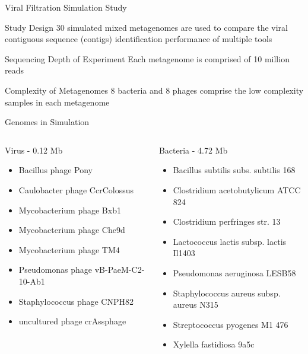 \documentclass[11pt]{beamer}
\begin{document}
	\begin{frame}{Viral Filtration Simulation Study}
	\begin{block}{Study Design}
	30 simulated mixed metagenomes are used to compare the viral contiguous sequence (contigs) identification performance of multiple tools
	\end{block}

	\begin{block}{Sequencing Depth of Experiment} 
	Each metagenome is comprised of 10 million reads
	\end{block}
	\begin{block}{Complexity of Metagenomes}
	8 bacteria and 8 phages comprise the low complexity samples in each metagenome
	\end{block}

	\end{frame}
	
	\begin{frame}{Genomes in Simulation}
	\begin{columns}
			\begin{block}{Virus - 0.12 Mb}
			\begin{itemize}
			\item Bacillus phage Pony
			\item Caulobacter phage CcrColossus
			\item Mycobacterium phage Bxb1
			\item Mycobacterium phage Che9d
			\item Mycobacterium phage TM4
			\item Pseudomonas phage vB-PaeM-C2-10-Ab1
			\item Staphylococcus phage CNPH82
			\item uncultured phage crAssphage
			\end{itemize}
			\end{block}	
			\begin{block}{Bacteria - 4.72 Mb}
			\begin{itemize}
			\item Bacillus subtilis subs. subtilis 168
			\item Clostridium acetobutylicum ATCC 824
			\item Clostridium perfringes str. 13
			\item Lactococcus lactis subsp. lactis Il1403
			\item Pseudomonas aeruginosa LESB58
			\item Staphylococcus aureus subsp. aureus N315
			\item Streptococcus pyogenes M1 476
			\item Xylella fastidiosa 9a5c
			\end{itemize}
			\end{block}
	\end{columns}
	\end{frame}
	
\end{document}
